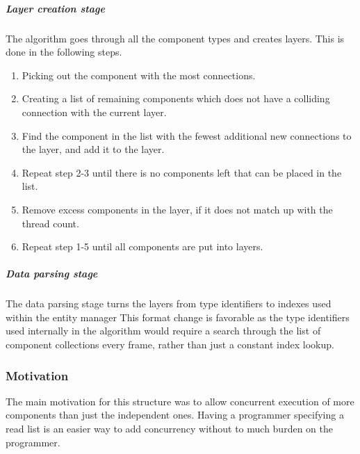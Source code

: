 %

\subparagraph{Layer creation stage}
The algorithm goes through all the component types and creates layers.
This is done in the following steps.

\begin{enumerate}
    \item Picking out the component with the most connections.

    \item Creating a list of remaining components which does not have a colliding connection with the current layer.

    \item Find the component in the list with the fewest additional new connections to the layer, and add it to the layer.

    \item Repeat step 2-3 until there is no components left that can be placed in the list.

    \item Remove excess components in the layer, if it does not match up with the thread count.

    \item Repeat step 1-5 until all components are put into layers.
\end{enumerate}

\subparagraph{Data parsing stage}
The data parsing stage turns the layers from type identifiers to indexes used within the entity manager
This format change is favorable as the type identifiers used internally in the algorithm would require a search through the list of component collections every frame, rather than just a constant index lookup.

\subsubsection{Motivation}
The main motivation for this structure was to allow concurrent execution of more components
than just the independent ones.
Having a programmer specifying a read list is an easier way to add concurrency without to much burden on the programmer.

